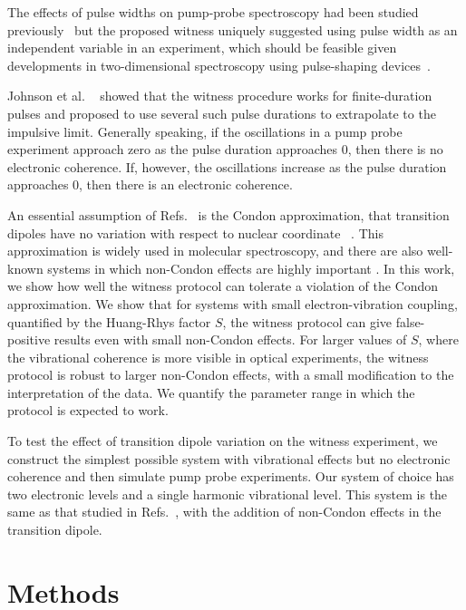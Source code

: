 The effects of pulse widths on pump-probe spectroscopy had been studied previously~\cite{pulseWidth} but the proposed witness uniquely suggested using pulse width as an independent variable in an experiment, which should be feasible given developments in two-dimensional spectroscopy using pulse-shaping devices~\cite{pulse1,pulse2,Stock1988,Stock1992}.

Johnson et al.  ~\cite{allanWitness} showed that the witness procedure works for finite-duration pulses and proposed to use several such pulse durations to extrapolate to the impulsive limit. Generally speaking, if the oscillations in a pump probe experiment approach zero as the pulse duration approaches 0, then there is no electronic coherence.  If, however, the oscillations increase as the pulse duration approaches 0, then there is an electronic coherence.

An essential assumption of Refs.~\cite{witness,allanWitness} is the Condon approximation, that transition dipoles have no variation with respect to nuclear coordinate ~\cite{Condon,FranckCondon}. This approximation is widely used in molecular spectroscopy, and there are also well-known systems in which non-Condon effects are highly important \cite{photosyntheticKappa,MavrosNonCondon,hellerGraphene,Hockett2011}. In this work, we show how well the witness protocol can tolerate a violation of the Condon approximation. We show that for systems with small electron-vibration coupling, quantified by the Huang-Rhys factor $S$, the witness protocol can give false-positive results even with small non-Condon effects. For larger values of $S$, where the vibrational coherence is more visible in optical experiments, the witness protocol is robust to larger non-Condon effects, with a small modification to the interpretation of the data. We quantify the parameter range in which the protocol is expected to work.


To test the effect of transition dipole variation on the witness experiment, we construct the simplest possible system with vibrational effects but no electronic coherence and then simulate pump probe experiments.  Our system of choice has two electronic levels and a single harmonic vibrational level. This system is the same as that studied in Refs.~\cite{witness,allanWitness}, with the addition of non-Condon effects in the transition dipole.

\section{Methods}

